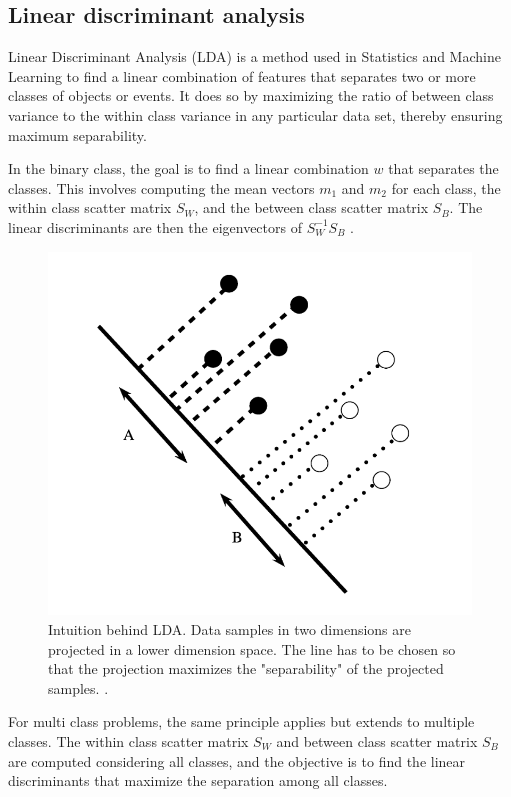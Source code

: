         \subsection{Linear discriminant analysis}
            Linear Discriminant Analysis (LDA) is a method used in Statistics and Machine Learning to find a linear combination of features that separates two or more classes of objects or events. It does so by maximizing the ratio of between class variance to the within class variance in any particular data set, thereby ensuring maximum separability.

            In the binary class, the goal is to find a linear combination $w$ that separates the classes. This involves computing the mean vectors $m_1$ and $m_2$ for each class, the within class scatter matrix $S_W$, and the between class scatter matrix $S_B$. The linear discriminants are then the eigenvectors of $S_W^{-1}S_B$ \cite{xanthopoulos_linear_2013}. 

            \begin{figure}[H]
                \centering
                \includegraphics[width=.6\textwidth]{../src/resources/images/models/lda.png}
                \caption{
                    Intuition behind LDA. Data samples in two dimensions are projected in a lower dimension space. The line has to be chosen so that the projection maximizes the "separability" of the projected samples. \cite{xanthopoulos_linear_2013}.
                }
                \label{fig:linear_discriminant_analysis}
            \end{figure}

            For multi class problems, the same principle applies but extends to multiple classes. The within class scatter matrix $S_W$ and between class scatter matrix $S_B$ are computed considering all classes, and the objective is to find the linear discriminants that maximize the separation among all classes.  

